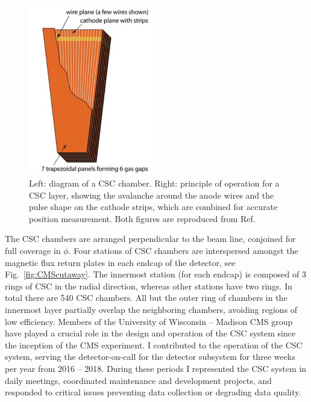 \begin{figure}[htbp]
  \centering
   \includegraphics[width=0.49\textwidth]{figures/LHCandCMS/CSCdiagram.png}
  \caption{
    Left: diagram of a CSC chamber. Right: principle of operation for a CSC
    layer, showing the avalanche around the anode wires and the pulse shape
    on the cathode strips, which are combined for accurate position measurement.
    Both figures are reproduced from Ref.~\cite{Chatrchyan:2008aa}
        }
 \label{fig:CSC}
\end{figure}

The CSC chambers are arranged perpendicular to the beam line,
conjoined for full coverage in $\phi$. Four stations of CSC chambers are interspersed
amongst the magnetic flux return plates in each endcap of the detector, see
Fig.~\ref{fig:CMScutaway}. The innermost station (for each endcap) is composed of 
3 rings of CSC in the radial direction, whereas other stations have two rings.
In total there are 540 CSC chambers. All but the outer ring of chambers in the 
innermost layer partially overlap the neighboring chambers, avoiding regions
of low efficiency. Members of the University of Wisconsin -- Madison 
CMS group have played a crucial role in the design and operation of the CSC
system since the inception of the CMS experiment. I contributed to the operation
of the CSC system, serving the detector-on-call for the
detector subsystem for three weeks per year from 2016 -- 2018. During these periods
I represented the CSC system in daily meetings, coordinated maintenance and 
development projects, and responded to critical issues preventing data collection
or degrading data quality.

